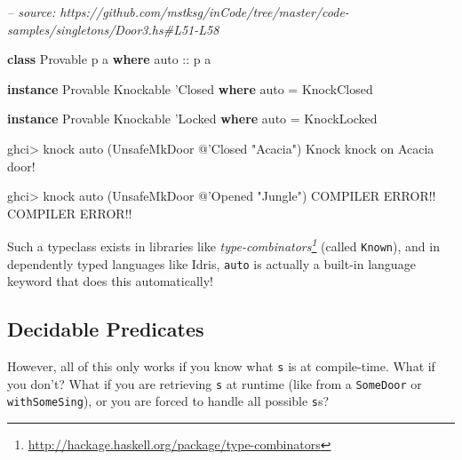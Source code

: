 \documentclass[]{article}
\newenvironment{Shaded}{}{}
\newcommand{\CommentTok}[1]{\textcolor[rgb]{0.38,0.63,0.69}{\textit{#1}}}
\newcommand{\DataTypeTok}[1]{\textcolor[rgb]{0.56,0.13,0.00}{#1}}
\newcommand{\FunctionTok}[1]{\textcolor[rgb]{0.02,0.16,0.49}{#1}}
\newcommand{\KeywordTok}[1]{\textcolor[rgb]{0.00,0.44,0.13}{\textbf{#1}}}
\newcommand{\NormalTok}[1]{#1}
\newcommand{\OtherTok}[1]{\textcolor[rgb]{0.00,0.44,0.13}{#1}}
\newcommand{\StringTok}[1]{\textcolor[rgb]{0.25,0.44,0.63}{#1}}
\renewcommand{\href}[2]{#2\footnote{\url{#1}}}
\begin{document}
\begin{Shaded}
\begin{Highlighting}[]
\CommentTok{-- source: https://github.com/mstksg/inCode/tree/master/code-samples/singletons/Door3.hs#L51-L58}

\KeywordTok{class} \DataTypeTok{Provable}\NormalTok{ p a }\KeywordTok{where}
\OtherTok{    auto ::}\NormalTok{ p a}

\KeywordTok{instance} \DataTypeTok{Provable} \DataTypeTok{Knockable}\NormalTok{ '}\DataTypeTok{Closed} \KeywordTok{where}
\NormalTok{    auto }\FunctionTok{=} \DataTypeTok{KnockClosed}

\KeywordTok{instance} \DataTypeTok{Provable} \DataTypeTok{Knockable}\NormalTok{ '}\DataTypeTok{Locked} \KeywordTok{where}
\NormalTok{    auto }\FunctionTok{=} \DataTypeTok{KnockLocked}
\end{Highlighting}
\end{Shaded}

\begin{Shaded}
\begin{Highlighting}[]
\NormalTok{ghci}\FunctionTok{>}\NormalTok{ knock auto (}\DataTypeTok{UnsafeMkDoor} \FunctionTok{@}\NormalTok{'}\DataTypeTok{Closed} \StringTok{"Acacia"}\NormalTok{)}
\DataTypeTok{Knock}\NormalTok{ knock on }\DataTypeTok{Acacia}\NormalTok{ door}\FunctionTok{!}

\NormalTok{ghci}\FunctionTok{>}\NormalTok{ knock auto (}\DataTypeTok{UnsafeMkDoor} \FunctionTok{@}\NormalTok{'}\DataTypeTok{Opened} \StringTok{"Jungle"}\NormalTok{)}
\DataTypeTok{COMPILER} \DataTypeTok{ERROR}\FunctionTok{!!} \DataTypeTok{COMPILER} \DataTypeTok{ERROR}\FunctionTok{!!}
\end{Highlighting}
\end{Shaded}

Such a typeclass exists in libraries like
\emph{\href{http://hackage.haskell.org/package/type-combinators}{type-combinators}}
(called \texttt{Known}), and in dependently typed languages like Idris,
\texttt{auto} is actually a built-in language keyword that does this
automatically!

\hypertarget{decidable-predicates}{%
\subsection{Decidable Predicates}\label{decidable-predicates}}

However, all of this only works if you know what \texttt{s} is at compile-time.
What if you don't? What if you are retrieving \texttt{s} at runtime (like from a
\texttt{SomeDoor} or \texttt{withSomeSing}), or you are forced to handle all
possible \texttt{s}s?
\end{document}
